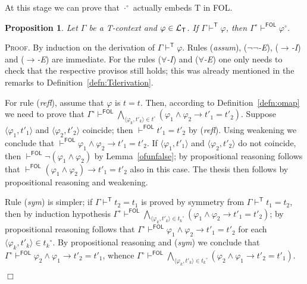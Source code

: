 \documentclass{article}
\newtheorem{proposition}[definition]{Proposition}
\newenvironment{proof}{\smallskip\textsc{Proof.}}{\hspace*{\fill}$\Box$}
\newcommand{\T}{\textsf T}
\newcommand{\FOL}{\textsf{FOL}}
\newcommand{\ofun}[1]{\ensuremath{{#1}^\circ}}
\newcommand{\omap}{\ofun\cdot}
\newcommand{\pair}[2]{\ensuremath{\langle{#1},{#2}\rangle}}
\newcommand{\lang}[1]{\ensuremath{{\cal L}_{\mathsf{#1}}}}
\newcommand{\myvdash}[1]{\ensuremath{\vdash^{\mathsf{#1}}}}
\begin{document}
\bigskip\noindent
At this stage we can prove that {\omap} actually embeds {\T} in {\FOL}.
\begin{proposition}\label{TtoFOL} Let $\Gamma$ be a {\T}-context and
$\varphi\in\lang{T}$.  If $\Gamma\myvdash{T}\varphi$, then
$\ofun\Gamma\myvdash{FOL}\ofun\varphi$.
\end{proposition}
\begin{proof}
By induction on the derivation of $\Gamma\myvdash{T}\varphi$.  Rules
(\emph{assum}), (\emph{$\neg\neg$-E}), (\emph{$\to$-I}) and
(\emph{$\to$-E}) are immediate.  For the rules (\emph{$\forall$-I})
and (\emph{$\forall$-E}) one only needs to check that the respective
provisos still holds; this was already mentioned in the remarks to
Definition~\ref{defn:Tderivation}.

For rule (\emph{refl}), assume that $\varphi$ is $t=t$.  Then,
according to Definition~\ref{defn:omap} we need to prove that
$\ofun\Gamma\myvdash{FOL}\bigwedge_{\pair{\varphi_k}{t'_k}\in\ofun{t}}%
\left(\varphi_1\wedge\varphi_2\to t'_1=t'_2\right)$.  Suppose
{\pair{\varphi_1}{t'_1}} and {\pair{\varphi_2}{t'_2}} coincide; then
$\myvdash{FOL}t'_1=t'_2$ by (\emph{refl}).  Using weakening we
conclude that $\myvdash{FOL}\varphi_1\wedge\varphi_2\to t'_1=t'_2$.
If {\pair{\varphi_1}{t'_1}} and {\pair{\varphi_2}{t'_2}} do not
coincide, then $\myvdash{FOL}\neg(\varphi_1\wedge\varphi_2)$ by
Lemma~\ref{ofunfalse}; by propositional reasoning follows that
$\myvdash{FOL}(\varphi_1\wedge\varphi_2)\to t'_1=t'_2$ also in this
case.  The thesis then follows by propositional reasoning and
weakening.

Rule (\emph{sym}) is simpler; if $\Gamma\myvdash T t_2=t_1$ is proved by
symmetry from $\Gamma\myvdash T t_1=t_2$, then by induction hypothesis
$\ofun\Gamma\myvdash{FOL} \bigwedge_{\pair{\varphi_k}{t'_k}\in\ofun{t_k}}
 \left(\varphi_1\wedge\varphi_2\to t'_1=t'_2\right)$; by propositional
reasoning follows that
$\ofun\Gamma\myvdash{FOL} \varphi_1\wedge\varphi_2\to t'_1=t'_2$ for each
$\pair{\varphi_k}{t'_k}\in\ofun{t_k}$.  By propositional reasoning and
(\emph{sym}) we conclude that
$\ofun\Gamma\myvdash{FOL} \varphi_2\wedge\varphi_1\to t'_2=t'_1$, whence
$\ofun\Gamma\myvdash{FOL} \bigwedge_{\pair{\varphi_k}{t'_k}\in\ofun{t_k}}
 \left(\varphi_2\wedge\varphi_1\to t'_2=t'_1\right)$.


\end{proof}
\end{document}
